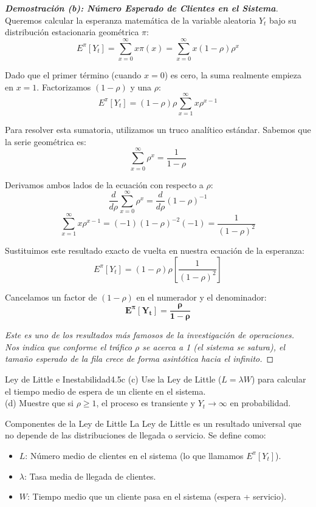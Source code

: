 \documentclass[10pt,a4paper]{article}
\begin{document}
\begin{proof}[\textbf{Demostración (b): Número Esperado de Clientes en el Sistema}]
    Queremos calcular la esperanza matemática de la variable aleatoria $Y_t$ 
    bajo su distribución estacionaria geométrica $\pi$:
    \[ E^\pi[Y_t] = \sum_{x=0}^\infty x \pi(x) = \sum_{x=0}^\infty x (1-\rho)\rho^x \]
    
    Dado que el primer término (cuando $x=0$) es cero, la suma realmente empieza en $x=1$. Factorizamos $(1-\rho)$ y una $\rho$:
    \[ E^\pi[Y_t] = (1-\rho)\rho \sum_{x=1}^\infty x \rho^{x-1} \]
    
    Para resolver esta sumatoria, utilizamos un truco analítico estándar. Sabemos que la serie geométrica es:
    \[ \sum_{x=0}^\infty \rho^x = \frac{1}{1-\rho} \]
    
    Derivamos ambos lados de la ecuación con respecto a $\rho$:
    \[ \frac{d}{d\rho} \sum_{x=0}^\infty \rho^x = \frac{d}{d\rho} (1-\rho)^{-1} \]
    \[ \sum_{x=1}^\infty x \rho^{x-1} = (-1)(1-\rho)^{-2}(-1) = \frac{1}{(1-\rho)^2} \]
    
    Sustituimos este resultado exacto de vuelta en nuestra ecuación de la esperanza:
    \[ E^\pi[Y_t] = (1-\rho)\rho \left[ \frac{1}{(1-\rho)^2} \right] \]
    
    Cancelamos un factor de $(1-\rho)$ en el numerador y el denominador:
    \[ \mathbf{E^\pi[Y_t] = \frac{\rho}{1-\rho}} \]
    
    \textit{Este es uno de los resultados más famosos de la investigación de operaciones. Nos indica que conforme el tráfico $\rho$ se acerca a 1 (el sistema se satura), el tamaño esperado de la fila crece de forma asintótica hacia el infinito.}
\end{proof}

\newpage

\vspace{5mm}

\begin{ejercicio}{Ley de Little e Inestabilidad}{4.5c}
    (c) Use la Ley de Little ($L = \lambda W$) para calcular el tiempo medio de espera de un cliente en el sistema. \\
    (d) Muestre que si $\rho \ge 1$, el proceso es transiente y $Y_t \to \infty$ en probabilidad.
\end{ejercicio}

\vspace{2mm}

\begin{nota}{Componentes de la Ley de Little}
    La Ley de Little es un resultado universal que no depende de las distribuciones de llegada o servicio. Se define como:
    \begin{itemize}
        \item $L$: Número medio de clientes en el sistema (lo que llamamos $E^\pi[Y_t]$).
        \item $\lambda$: Tasa media de llegada de clientes.
        \item $W$: Tiempo medio que un cliente pasa en el sistema (espera + servicio).
    \end{itemize}
\end{nota}
\end{document}
